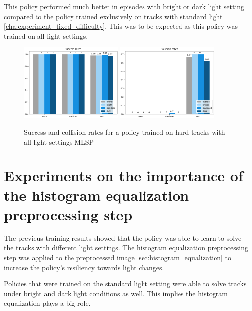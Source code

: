 This policy performed much better in episodes with bright or dark light setting compared to the policy trained exclusively on tracks with standard light \ref{cha:experiment_fixed_difficulty}. This was to be expected as this policy was trained on all light settings.

\begin{figure}
    \centering
    \includegraphics[width=0.45\textwidth]{Bilder/notebook_images/hardDistanceMixedLight_eval_all_success_rates_barplot.png}
    \includegraphics[width=0.45\textwidth]{Bilder/notebook_images/hardDistanceMixedLight_eval_all_collision_rates_barplot.png}
    \caption{Success and collision rates for a policy trained on hard tracks with all light settings \acs{MLSP}}
    \label{fig:hardDistance_mixedLightTraining_results}
\end{figure}



\section{Experiments on the importance of the histogram equalization preprocessing step}
\label{sec:importance_histogram_equalization}

The previous training results showed that the policy was able to learn to solve the tracks with different light settings. The histogram equalization preprocessing step was applied to the preprocessed image \ref{sec:histogram_equalization} to increase the policy's resiliency towards light changes.

Policies that were trained on the standard light setting were able to solve tracks under bright and dark light conditions as well. This implies the histogram equalization plays a big role.

